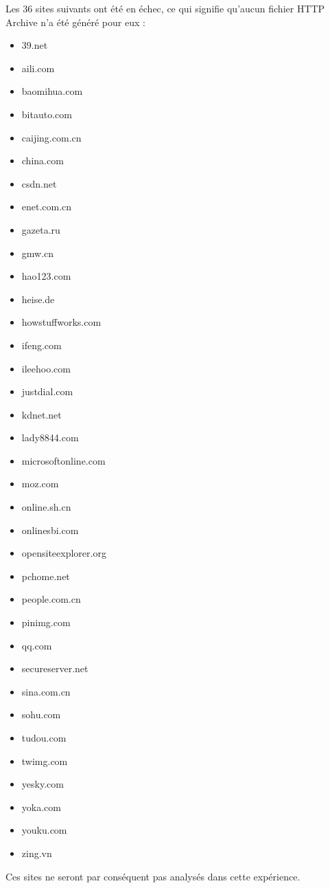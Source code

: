 Les 36 sites suivants ont été en échec, ce qui signifie qu'aucun fichier HTTP Archive n'a été généré pour eux :
\begin{multicols}{3}
\begin{itemize}
  \item 39.net
  \item aili.com
  \item baomihua.com
  \item bitauto.com
  \item caijing.com.cn
  \item china.com
  \item csdn.net
  \item enet.com.cn
  \item gazeta.ru
  \item gmw.cn
  \item hao123.com
  \item heise.de
  \item howstuffworks.com
  \item ifeng.com
  \item ileehoo.com
  \item justdial.com
  \item kdnet.net
  \item lady8844.com
  \item microsoftonline.com
  \item moz.com
  \item online.sh.cn
  \item onlinesbi.com
  \item opensiteexplorer.org
  \item pchome.net
  \item people.com.cn
  \item pinimg.com
  \item qq.com
  \item secureserver.net
  \item sina.com.cn
  \item sohu.com
  \item tudou.com
  \item twimg.com
  \item yesky.com
  \item yoka.com
  \item youku.com
  \item zing.vn
\end{itemize}
\end{multicols}

Ces sites ne seront par conséquent pas analysés dans cette expérience.
\newline

